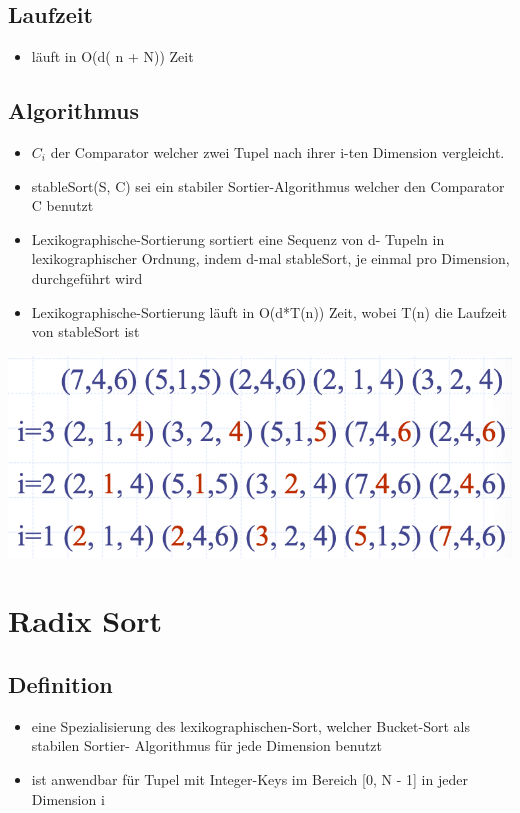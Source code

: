 \subsection{Laufzeit}
\begin{itemize}
    \item läuft in O(d( n + N)) Zeit
\end{itemize}

\subsection{Algorithmus}
\begin{itemize}
    \item $C_i$ der Comparator welcher zwei Tupel nach ihrer i-ten Dimension vergleicht.
    \item stableSort(S, C) sei ein stabiler Sortier-Algorithmus welcher den Comparator C benutzt
    \item Lexikographische-Sortierung sortiert eine Sequenz von d- Tupeln in lexikographischer Ordnung, indem d-mal stableSort, je einmal pro Dimension, durchgeführt wird
    \item Lexikographische-Sortierung läuft in O(d*T(n)) Zeit, wobei T(n) die Laufzeit von stableSort ist
\end{itemize}
\vspace{-8pt}
\begin{center}
    \includegraphics[scale=.22]{graphic/07 RadixSort/lexi.png}
\end{center}
\vspace{-8pt}


\section{Radix Sort}
\subsection{Definition}
\begin{itemize}
    \item eine Spezialisierung des lexikographischen-Sort, welcher Bucket-Sort als stabilen Sortier- Algorithmus für jede Dimension benutzt
    \item ist anwendbar für Tupel mit Integer-Keys im Bereich [0, N - 1] in jeder Dimension i
\end{itemize}

